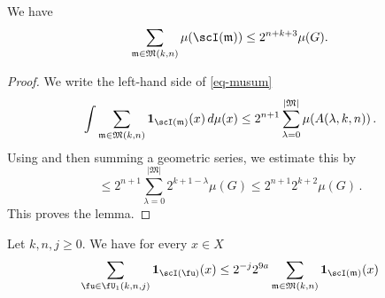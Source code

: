 \begin{lemma}
\label{top-tiles}
\leanok
{}
    We have
    \begin{equation}\label{eq-musum}
        \sum_{\mathfrak{m} \in \mathfrak{M}(k,n)} \mu(\scI(\mathfrak{m}))\le 2^{n+k+3}\mu(G).
    \end{equation}
\end{lemma}
\begin{proof}
\leanok
We write the left-hand side of \eqref{eq-musum}
\begin{equation}
    \int \sum_{\mathfrak{m} \in \mathfrak{M}(k,n)} \mathbf{1}_{\scI(\mathfrak{m})}(x) \, d\mu(x) \le
2^{n+1} \sum_{\lambda=0}^{|\mathfrak{M}|}\mu(A(\lambda, k,n))\,.
\end{equation}
Using 
and then summing a geometric series, we estimate this by
\begin{equation}
    \le
2^{n+1}\sum_{\lambda=0}^{|\mathfrak{M}|}
2^{k+1-\lambda}\mu(G)
\le
2^{n+1}2^{k+2}\mu(G)\, .
\end{equation}
This proves the lemma.
\end{proof}


\begin{lemma}
\label{tree-count}
\leanok
{}
Let $k,n,j\ge 0$. We have for every $x\in X$
\begin{equation}
    \sum_{\fu\in \fU_1(k,n,j)} \mathbf{1}_{\scI(\fu)}(x)
    \le 2^{-j}
    2^{9a} \sum_{\mathfrak{m}\in \mathfrak{M}(k,n)}
     \mathbf{1}_{\scI(\mathfrak{m})}(x)
\end{equation}
\end{lemma}


